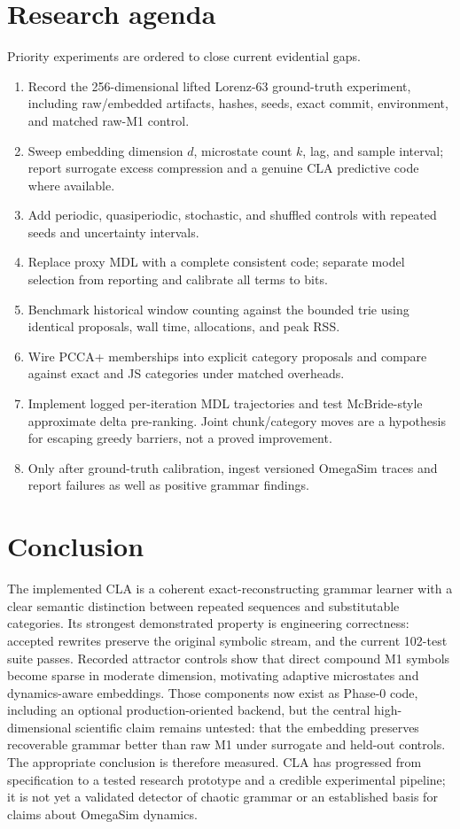 \documentclass[11pt]{article}
\begin{document}
\section{Research agenda}
Priority experiments are ordered to close current evidential gaps.
\begin{enumerate}[leftmargin=*]
\item Record the 256-dimensional lifted Lorenz-63 ground-truth experiment, including raw/embedded artifacts, hashes, seeds, exact commit, environment, and matched raw-M1 control.
\item Sweep embedding dimension $d$, microstate count $k$, lag, and sample interval; report surrogate excess compression and a genuine CLA predictive code where available.
\item Add periodic, quasiperiodic, stochastic, and shuffled controls with repeated seeds and uncertainty intervals.
\item Replace proxy MDL with a complete consistent code; separate model selection from reporting and calibrate all terms to bits.
\item Benchmark historical window counting against the bounded trie using identical proposals, wall time, allocations, and peak RSS.
\item Wire PCCA+ memberships into explicit category proposals and compare against exact and JS categories under matched overheads.
\item Implement logged per-iteration MDL trajectories and test McBride-style approximate delta pre-ranking. Joint chunk/category moves are a hypothesis for escaping greedy barriers, not a proved improvement.
\item Only after ground-truth calibration, ingest versioned OmegaSim traces and report failures as well as positive grammar findings.
\end{enumerate}

\section{Conclusion}
The implemented CLA is a coherent exact-reconstructing grammar learner with a clear semantic distinction between repeated sequences and substitutable categories. Its strongest demonstrated property is engineering correctness: accepted rewrites preserve the original symbolic stream, and the current 102-test suite passes. Recorded attractor controls show that direct compound M1 symbols become sparse in moderate dimension, motivating adaptive microstates and dynamics-aware embeddings. Those components now exist as Phase-0 code, including an optional production-oriented backend, but the central high-dimensional scientific claim remains untested: that the embedding preserves recoverable grammar better than raw M1 under surrogate and held-out controls. The appropriate conclusion is therefore measured. CLA has progressed from specification to a tested research prototype and a credible experimental pipeline; it is not yet a validated detector of chaotic grammar or an established basis for claims about OmegaSim dynamics.
\end{document}
